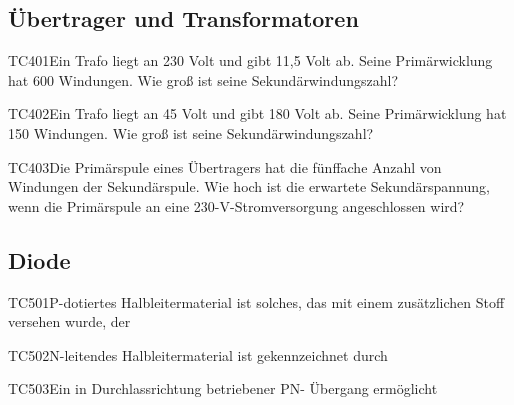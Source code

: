 \subsection{Übertrager und Transformatoren}

\begin{question}{TC401}{Ein Trafo liegt an 230 Volt und gibt 11,5 Volt ab. Seine Primärwicklung hat 600 Windungen. Wie groß ist seine Sekundärwindungszahl?}
\end{question}

\begin{question}{TC402}{Ein Trafo liegt an 45 Volt und gibt 180 Volt ab. Seine Primärwicklung hat 150 Windungen. Wie groß ist seine Sekundärwindungszahl?}
\end{question}

\begin{question}{TC403}{Die Primärspule eines Übertragers hat die fünffache Anzahl von Windungen der Sekundärspule. Wie hoch ist die erwartete Sekundärspannung, wenn die Primärspule an eine 230-V-Stromversorgung angeschlossen wird?}
\end{question}

\subsection{Diode}

\begin{question}{TC501}{P-dotiertes Halbleitermaterial ist solches, das mit einem zusätzlichen Stoff versehen wurde, der}
\end{question}

\begin{question}{TC502}{N-leitendes Halbleitermaterial ist gekennzeichnet durch}
\end{question}

\begin{question}{TC503}{Ein in Durchlassrichtung betriebener PN- Übergang ermöglicht}
\end{question}

